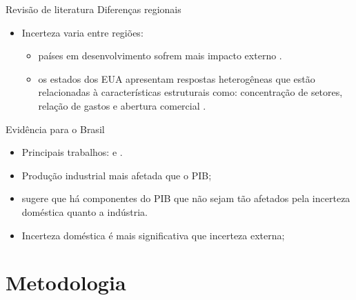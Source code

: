 \documentclass[aspectratio=169, 10pt]{beamer}
\begin{document}
\begin{frame}{Revisão de literatura}
Diferenças regionais
\begin{itemize}
    \item Incerteza varia entre regiões:
    \begin{itemize}
        \item países em desenvolvimento sofrem mais impacto externo \cite{bloom2017observations}.
        \item os estados dos EUA apresentam respostas heterogêneas que estão relacionadas à características estruturais como: concentração de setores, relação de gastos e abertura comercial \cite{mumtaz2018does, mumtaz2018stateimpact, silva2024effects}.
   \end{itemize}
\end{itemize}
Evidência para o Brasil
\begin{itemize}
    \item Principais trabalhos:  e .
     \item Produção industrial mais afetada que o PIB;
     \item {} sugere que há componentes do PIB que não sejam tão afetados pela incerteza doméstica quanto a indústria.
     \item Incerteza doméstica é mais significativa que incerteza externa;
\end{itemize}
\end{frame}

\section{Metodologia}
\end{document}
